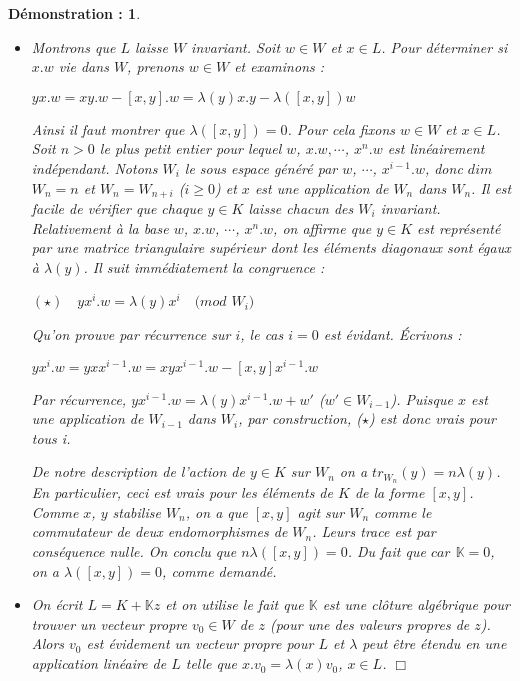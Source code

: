 \documentclass[a4paper,openany,12pt]{report}
\newcommand{\KK}{\mathbb{K}}
\theoremstyle{break}
{\theorembodyfont{\upshape}
\newtheorem*{rmq}{Remarque :}
\newtheorem*{prv}{Preuve :}
\newtheorem*{ex}{Exemples :}
\newtheorem{exe}{Exemple : }
\newtheorem*{nota}{Notation :}}
\newtheorem*{dem}{D\'emonstration :}
\begin{document}
\begin{dem}
\begin{itemize}
\item[(3)] Montrons que $L$ laisse $W$ invariant. Soit $w \in W$ et $x \in L$. Pour déterminer si $x.w$ vie dans $W$, prenons $w \in W$ et examinons :
\begin{center}
$yx.w=xy.w-[x,y].w= \lambda(y)x.y- \lambda([x,y])w $
\end{center}
Ainsi il faut montrer que $\lambda([x,y])=0$. Pour cela fixons $w \in W$ et $x \in L$. Soit $n>0$ le plus petit entier pour lequel $w$, $x.w, \cdots$, $x^{n}.w$ est linéairement indépendant. Notons $W_{i}$ le sous espace généré par $w$, $\cdots$, $x^{i-1}.w$, donc $dim$ $W_{n}=n$ et $W_{n}=W_{n+i}$ ($i\geq 0$) et $x$ est une application de $W_{n}$ dans $W_{n}$. Il est facile de vérifier que chaque $y \in K$ laisse chacun des $W_{i}$ invariant. Relativement à la base $w$, $x.w$, $\cdots$, $x^{n}.w$, on affirme que $y \in K$ est représenté par une matrice triangulaire supérieur dont les éléments diagonaux sont égaux à $\lambda(y)$. Il suit immédiatement la congruence :
\begin{center}
$(\star) \quad yx^{i}.w = \lambda(y)x^{i} \quad (mod$ $W_{i})$
\end{center}
Qu'on prouve par récurrence sur $i$, le cas $i=0$ est évidant. Écrivons :
\begin{center}
$yx^{i}.w = yxx^{i-1}.w = xyx^{i-1}.w -[x,y]x^{i-1}.w $
\end{center}
Par récurrence, $yx^{i-1}.w = \lambda(y)x^{i-1}.w+w'$ ($w' \in W_{i-1}$). Puisque $x$ est une application de $W_{i-1}$ dans $W_{i}$, par construction, ($\star$) est donc vrais pour tous i.

De notre description de l'action de $y \in K$ sur $W_{n}$ on a $tr_{W_{n}}(y)=n \lambda(y)$. En particulier, ceci est vrais pour les éléments de $K$ de la forme $[x,y]$. Comme $x$, $y$ stabilise $W_{n}$, on a que $[x,y]$ agit sur $W_{n}$ comme le commutateur de deux endomorphismes de $W_{n}$. Leurs trace est par conséquence nulle. On conclu que $n \lambda([x,y]) = 0$. Du fait que $car$ $\KK=0$, on a $\lambda([x,y])=0$, comme demandé.

\item[(4)] On écrit $L=K+ \KK z$ et on utilise le fait que $\KK$ est une clôture algébrique pour trouver un vecteur propre $v_{0} \in W$ de $z$ (pour une des valeurs propres de $z$). Alors $v_{0}$ est évidement un vecteur propre pour $L$ et $\lambda$ peut être étendu en une application linéaire de $L$ telle que $x.v_{0} = \lambda(x)v_{0}$, $x \in L$. $\Box$
\end{itemize}
\end{dem}
\end{document}
